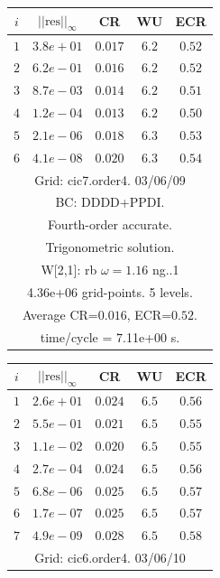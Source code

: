 \begin{table}[hbt]
\begin{center}
{\begin{tabular}{|c|c|c|c|c|}
\hline 
\end{tabular}
\begin{tabular}{|c|c|c|c|c|} \hline 
 $i$   & $\vert\vert\mbox{res}\vert\vert_\infty$  &  CR     &  WU    & ECR  \\   \hline 
 $ 1$  & $ 3.8e+01$ & $0.017$ & $ 6.2$ & $0.52$ \\ 
 $ 2$  & $ 6.2e-01$ & $0.016$ & $ 6.2$ & $0.52$ \\ 
 $ 3$  & $ 8.7e-03$ & $0.014$ & $ 6.2$ & $0.51$ \\ 
 $ 4$  & $ 1.2e-04$ & $0.013$ & $ 6.2$ & $0.50$ \\ 
 $ 5$  & $ 2.1e-06$ & $0.018$ & $ 6.3$ & $0.53$ \\ 
 $ 6$  & $ 4.1e-08$ & $0.020$ & $ 6.3$ & $0.54$ \\ 
\hline 
\multicolumn{5}{|c|}{Grid: cic7.order4. 03/06/09}  \\
\multicolumn{5}{|c|}{BC: DDDD+PPDI.}  \\
\multicolumn{5}{|c|}{Fourth-order accurate.}  \\
\multicolumn{5}{|c|}{Trigonometric solution.}  \\
\multicolumn{5}{|c|}{W[2,1]: rb $\omega=1.16$ ng..1}  \\
\multicolumn{5}{|c|}{4.36e+06 grid-points. 5 levels.}  \\
\multicolumn{5}{|c|}{Average CR=$0.016$, ECR=$0.52$.}  \\
\multicolumn{5}{|c|}{time/cycle = 7.11e+00 s.}  \\
\hline 
\end{tabular}
\begin{tabular}{|c|c|c|c|c|} \hline 
 $i$   & $\vert\vert\mbox{res}\vert\vert_\infty$  &  CR     &  WU    & ECR  \\   \hline 
 $ 1$  & $ 2.6e+01$ & $0.024$ & $ 6.5$ & $0.56$ \\ 
 $ 2$  & $ 5.5e-01$ & $0.021$ & $ 6.5$ & $0.55$ \\ 
 $ 3$  & $ 1.1e-02$ & $0.020$ & $ 6.5$ & $0.55$ \\ 
 $ 4$  & $ 2.7e-04$ & $0.024$ & $ 6.5$ & $0.56$ \\ 
 $ 5$  & $ 6.8e-06$ & $0.025$ & $ 6.5$ & $0.57$ \\ 
 $ 6$  & $ 1.7e-07$ & $0.025$ & $ 6.5$ & $0.57$ \\ 
 $ 7$  & $ 4.9e-09$ & $0.028$ & $ 6.5$ & $0.58$ \\ 
\hline 
\multicolumn{5}{|c|}{Grid: cic6.order4. 03/06/10}  \\

\end{tabular}}
\end{center}
\end{table}
